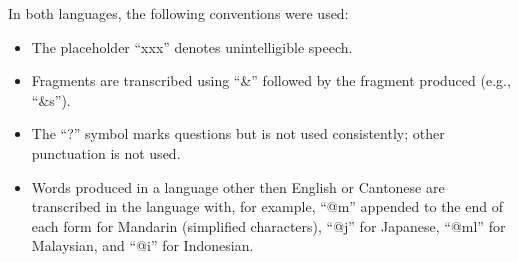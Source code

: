 In both languages, the following conventions were used:
\begin{itemize}
 \item The placeholder ``xxx'' denotes unintelligible speech.
 \item Fragments are transcribed using ``\&'' followed by the fragment produced (e.g., ``\&s'').
 \item The ``?'' symbol marks questions but is not used consistently; other punctuation is not used.
\item Words produced in a language other then English or Cantonese are transcribed in the language with, for example, ``@m'' appended to the end of each form for Mandarin (simplified characters), ``@j'' for Japanese, ``@ml'' for Malaysian, and ``@i'' for Indonesian.

\end{itemize}

